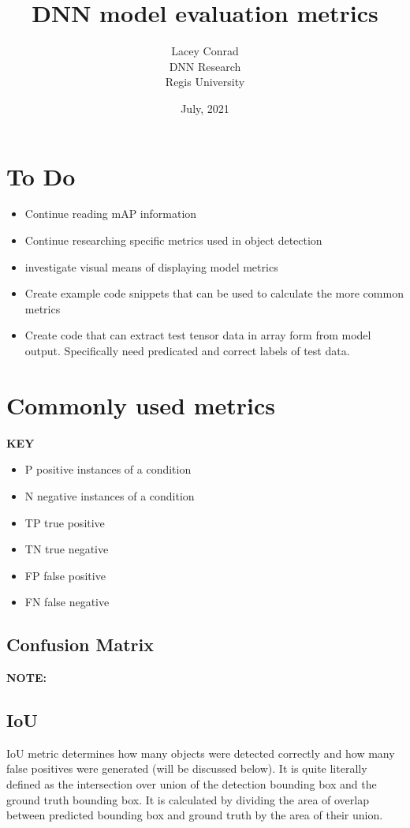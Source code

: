 \documentclass[]{article}
\title{DNN model evaluation metrics}
\author{Lacey Conrad\\DNN Research\\ Regis University}
\date{July, 2021}
\begin{document}
	\maketitle


\section{To Do}
\begin{itemize}
\item Continue reading mAP information
\item Continue researching specific metrics used in object detection
\item investigate visual means of displaying model metrics
\item Create example code snippets that can be used to calculate the more common metrics
\item Create code that can extract test tensor data in array form from model output.   Specifically need predicated and correct labels of test data.  
\end{itemize}
\section{Commonly used metrics}
\textbf{KEY}
\begin{itemize}
\item P positive instances of a condition 
\item N negative instances of a condition
\item TP true positive
\item TN true negative
\item FP false positive
\item FN false negative
\end{itemize}
\subsection{Confusion Matrix}
\textbf{NOTE:} 
\subsection{IoU}

 IoU metric determines how many objects were detected correctly and how many false positives were generated (will be discussed below).  It is quite literally defined as the intersection over union of the detection bounding box and the ground truth bounding box.  It is calculated by dividing the area of overlap between predicted bounding box and ground truth by the area of their union.\\
\end{document}
